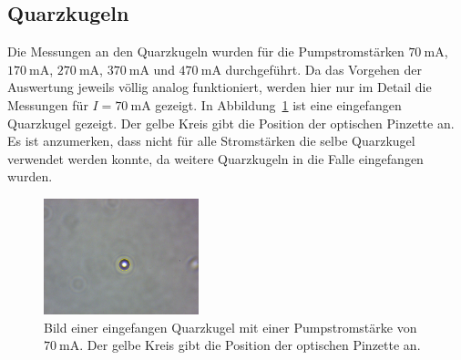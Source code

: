 \FloatBarrier
\subsection{Quarzkugeln}
Die Messungen an den Quarzkugeln wurden für die Pumpstromstärken $\SI{70}{\milli\ampere}$, $\SI{170}{\milli\ampere}$,
$\SI{270}{\milli\ampere}$, $\SI{370}{\milli\ampere}$ und $\SI{470}{\milli\ampere}$ durchgeführt. Da das Vorgehen der Auswertung
jeweils völlig analog funktioniert, werden hier nur im Detail die Messungen für $I = \SI{70}{\milli\ampere}$ gezeigt.
In Abbildung~\ref{fig: quarz_screenshot} ist eine eingefangen Quarzkugel gezeigt. Der gelbe Kreis gibt die Position
der optischen Pinzette an. Es ist anzumerken, dass nicht für alle Stromstärken die selbe Quarzkugel verwendet werden
konnte, da weitere Quarzkugeln in die Falle eingefangen wurden.
\begin{figure}
  \centering
  \includegraphics[width = 0.4\textwidth]{../analysis/data/i_quarz/70mA/070mA_screenshot.png}
  \caption{Bild einer eingefangen Quarzkugel mit einer Pumpstromstärke von $\SI{70}{\milli\ampere}$. Der gelbe Kreis gibt die
  Position der optischen Pinzette an.}
  \label{fig: quarz_screenshot}
\end{figure}
\FloatBarrier

